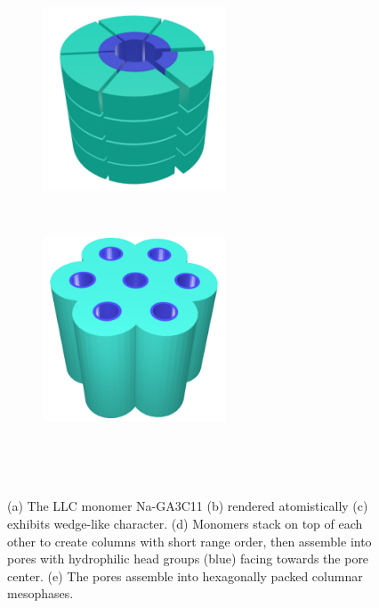 \documentclass[journal=jpcbfk,manuscript=article]{achemso}
\begin{document}
\begin{figure}
\begin{subfigure}{0.3\linewidth}
		\caption{}~\label{fig:wedge}
	\end{subfigure}
		\begin{subfigure}{0.4\linewidth}
		\centering
		\includegraphics[width=0.6\textwidth]{columns.pdf}
		\caption{}~\label{fig:wedge_layer}
	\end{subfigure}
	\begin{subfigure}{0.4\linewidth}
		\centering
		\includegraphics[width=0.6\textwidth]{hexagonal_packing.pdf}
		\caption{}~\label{fig:hex_packing_simple}
	\end{subfigure}
	\caption{(a) The LLC monomer Na-GA3C11 (b) rendered atomistically (c)
	exhibits wedge-like character. (d) Monomers stack on top of each other to
	create columns with short range order, then assemble into pores with 
	hydrophilic head groups (blue) facing towards the pore center. (e) The 
	pores assemble into hexagonally packed columnar mesophases.}~\label{fig:assembly}
  \end{figure}
\end{document}
